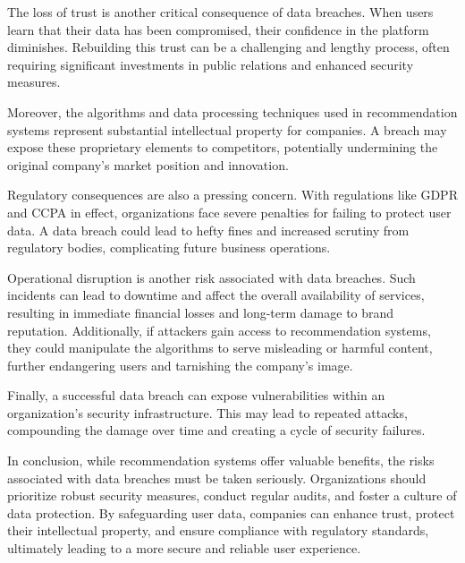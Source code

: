 \documentclass[10pt,twoside,slovak,a4paper]{article}
\begin{document}
The loss of trust is another critical consequence of data breaches. When users learn that their data has been compromised, their confidence in the platform diminishes\cite{data}. Rebuilding this trust can be a challenging and lengthy process, often requiring significant investments in public relations and enhanced security measures.

\newpage
Moreover, the algorithms and data processing techniques used in recommendation systems represent substantial intellectual property for companies. A breach may expose these proprietary elements to competitors, potentially undermining the original company's market position and innovation.

Regulatory consequences are also a pressing concern. With regulations like GDPR and CCPA in effect, organizations face severe penalties for failing to protect user data. A data breach could lead to hefty fines and increased scrutiny from regulatory bodies, complicating future business operations.

Operational disruption is another risk associated with data breaches\cite{info}. Such incidents can lead to downtime and affect the overall availability of services, resulting in immediate financial losses and long-term damage to brand reputation. Additionally, if attackers gain access to recommendation systems, they could manipulate the algorithms to serve misleading or harmful content, further endangering users and tarnishing the company’s image.

Finally, a successful data breach can expose vulnerabilities within an organization’s security infrastructure\cite{data}. This may lead to repeated attacks, compounding the damage over time and creating a cycle of security failures.

In conclusion, while recommendation systems offer valuable benefits, the risks associated with data breaches must be taken seriously. Organizations should prioritize robust security measures, conduct regular audits, and foster a culture of data protection. By safeguarding user data, companies can enhance trust, protect their intellectual property, and ensure compliance with regulatory standards, ultimately leading to a more secure and reliable user experience.
\end{document}
